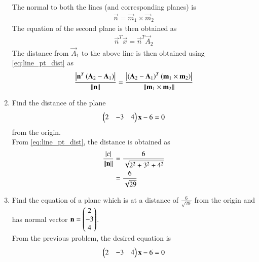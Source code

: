 \begin{enumerate}[label=\arabic*.,ref=\thesubsection.\theenumi]
The normal to both the lines (and corresponding planes) is 
%
\begin{align}
\label{eq:line_dist_skew_normal}
\vec{n} = \vec{m}_1\times\vec{m}_2
\end{align}
%
The equation of the second plane is then obtained as
%
\begin{align}
\label{eq:line_dist_skew_plane2}
\vec{n}^T \vec{x} = \vec{n}^T \vec{A}_2 
\end{align}
%
The distance from $\vec{A}_1$ to the above line is then obtained using 
\eqref{eq:line_pt_dist} as
%
\begin{align}
\label{eq:line_dist_skew}
\frac{\left\vert\mathbf{n}^T\left(\mathbf{A}_2-\mathbf{A}_1\right)\right\vert}{\left\lVert\mathbf{n}\right\rVert}
=
\frac{\left\vert\left(\mathbf{A}_2-\mathbf{A}_1\right)^T\left(\mathbf{m}_1\times\mathbf{m}_2\right)\right\vert}{\left\lVert\mathbf{m}_1\times\mathbf{m}_2\right\rVert}
\end{align}
%

\item Find the distance of the plane 
\begin{align}
\begin{pmatrix}2 & -3 & 4\end{pmatrix}\mathbf{x}-6  = 0
\end{align}
%
from the origin.
\\
\solution From \eqref{eq:line_pt_dist}, the distance is obtained as
%
\begin{align}
\frac{\left\vert c\right\vert}{\left\lVert\mathbf{n}\right\rVert} &= \frac{6}{\sqrt{2^2+3^2+4^2}}
\\
&= \frac{6}{\sqrt{29}}
\end{align}
%

\item Find the equation of a plane which is at a distance of $\frac{6}{\sqrt{29}}$ from the origin and has  normal vector $\mathbf{n}=\begin{pmatrix}2\\-3\\4\end{pmatrix}$.
%
\\
\solution From the previous problem, the desired equation is
%
\begin{align}
\begin{pmatrix}2 & -3 & 4\end{pmatrix}\mathbf{x}-6  = 0
\end{align}
%


\end{enumerate}
